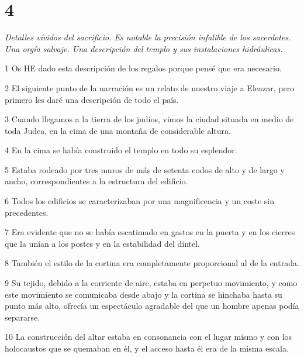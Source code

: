 \chapter{4}

\par \textit{Detalles vívidos del sacrificio. Es notable la precisión infalible de los sacerdotes. Una orgía salvaje. Una descripción del templo y sus instalaciones hidráulicas.}

\par 1 Os HE dado esta descripción de los regalos porque pensé que era necesario.

\par 2 El siguiente punto de la narración es un relato de nuestro viaje a Eleazar, pero primero les daré una descripción de todo el país.

\par 3 Cuando llegamos a la tierra de los judíos, vimos la ciudad situada en medio de toda Judea, en la cima de una montaña de considerable altura.

\par 4 En la cima se había construido el templo en todo su esplendor.

\par 5 Estaba rodeado por tres muros de más de setenta codos de alto y de largo y ancho, correspondientes a la estructura del edificio.

\par 6 Todos los edificios se caracterizaban por una magnificencia y un coste sin precedentes.

\par 7 Era evidente que no se había escatimado en gastos en la puerta y en los cierres que la unían a los postes y en la estabilidad del dintel.

\par 8 También el estilo de la cortina era completamente proporcional al de la entrada.

\par 9 Su tejido, debido a la corriente de aire, estaba en perpetuo movimiento, y como este movimiento se comunicaba desde abajo y la cortina se hinchaba hasta su punto más alto, ofrecía un espectáculo agradable del que un hombre apenas podía separarse.

\par 10 La construcción del altar estaba en consonancia con el lugar mismo y con los holocaustos que se quemaban en él, y el acceso hasta él era de la misma escala.

